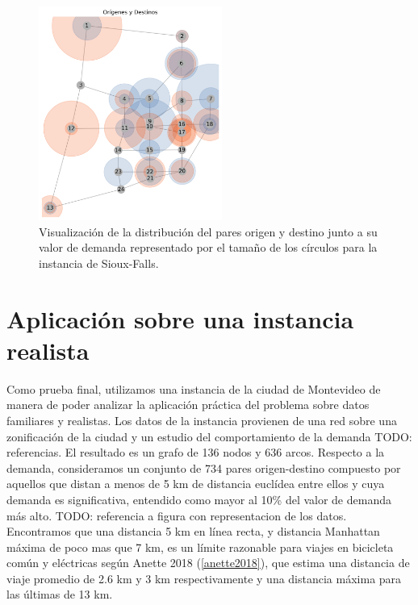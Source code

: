\documentclass{article}
\begin{document}
  \begin{figure}[h!]
    \centering
    \includegraphics[width=6cm]{../resources/sioux_falls_demand.png}
      \caption{Visualización de la distribución del pares origen y destino junto a su valor de demanda representado por el tamaño de los círculos para la instancia de Sioux-Falls.}
    \label{fig:sioux_falls_demand}
  \end{figure}


  \section{Aplicación sobre una instancia realista}

  Como prueba final, utilizamos una instancia de la ciudad de Montevideo de manera de poder analizar la aplicación práctica del problema sobre datos familiares y realistas. Los datos de la instancia provienen de una red sobre una zonificación de la ciudad y un estudio del comportamiento de la demanda TODO: referencias. El resultado es un grafo de 136 nodos y 636 arcos. Respecto a la demanda, consideramos un conjunto de 734 pares origen-destino compuesto por aquellos que distan a menos de 5 km de distancia euclídea entre ellos y cuya demanda es significativa, entendido como mayor al 10\% del valor de demanda más alto. TODO: referencia a figura con representacion de los datos. Encontramos que una distancia 5 km en línea recta, y distancia Manhattan máxima de poco mas que 7 km, es un límite razonable para viajes en bicicleta común y eléctricas según Anette 2018 (\ref{anette2018}), que estima una distancia de viaje promedio de 2.6 km y 3 km respectivamente y una distancia máxima para las últimas de 13 km.
\end{document}
